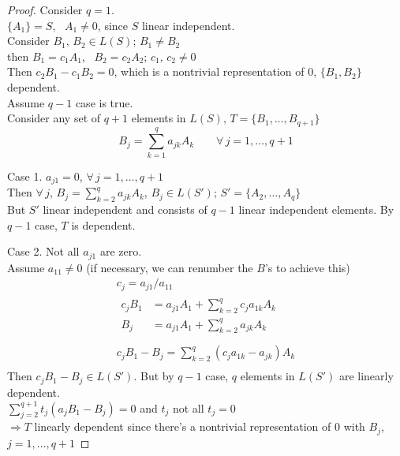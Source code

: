 \documentclass[twoside]{amsart}
\theoremstyle{plain}
\theoremstyle{definition}
\begin{document}
\begin{proof}
  Consider $q=1$.  \\
  $\{ A_1 \} = S$, \, $A_1 \neq 0$, since $S$ linear independent.  \medskip \\
  Consider $B_1, \, B_2 \in L(S)$; $B_1 \neq B_2$ \\
  \phantom{ consider } then $B_1 = c_1 A_1$, \, $B_2 = c_2 A_2$; \quad $c_1,\, c_2 \neq 0$ \medskip \\
  Then $c_2 B_1 - c_1 B_2 = 0$, which is a nontrivial representation of $0$, $\{ B_1, B_2 \}$ dependent.   \\

Assume $q-1$ case is true.   \\

Consider any set of $q+1$ elements in $L(S)$, $T = \{ B_1, \dots, B_{q+1} \}$ 
\[
B_j = \sum_{k=1}^q a_{jk} A_k \quad \quad \forall \, j = 1, \dots, q+1
\]

\noindent Case 1. $a_{j1} = 0$, $\forall \, j = 1, \dots, q+1$ \\
\phantom{ Case } Then $\forall \, j$, $B_j = \sum_{k=2}^q a_{jk}A_k $, \quad $B_j \in L(S')$; $S' = \{ A_2, \dots, A_q \}$ \\
But $S'$ linear independent and consists of $q-1$ linear independent elements.  By $q-1$ case, $T$ is dependent.  

\noindent Case 2. Not all $a_{j1}$ are zero.  \medskip \\
Assume $a_{11} \neq 0$ (if necessary, we can renumber the $B$'s to achieve this)
\[
\begin{gathered}
  c_j = a_{j1}/a_{11} \\
 \begin{aligned} 
   c_j B_1  & = a_{j1} A_1 + \sum_{k=2}^q c_j a_{1k} A_k \\
   B_j & = a_{j1} A_1 + \sum_{k=2}^q a_{jk} A_k  \\
\end{aligned} \\
 c_j B_1 - B_j = \sum_{k=2}^q (c_j a_{1k} - a_{jk} ) A_k  \\
\end{gathered}
\]
Then $c_j B_1 - B_j \in L(S')$.  But by $q-1$ case, $q$ elements in $L(S')$ are linearly dependent.  \medskip \\
$\sum_{j=2}^{q+1} t_j (a_j B_1 - B_j) =0 $ and $t_j$ not all $t_j =0$ \medskip \\
$\Longrightarrow T$ linearly dependent since there's a nontrivial representation of $0$ with $B_j$, $j=1, \dots, q+1$ 
\end{proof}
\end{document}
